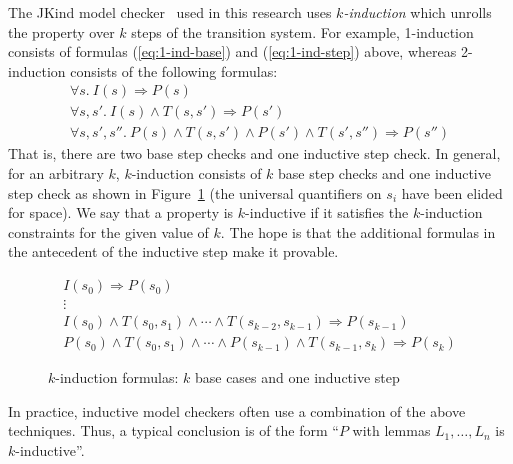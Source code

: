 The JKind model checker~\cite{2017arXiv171201222G} used in this research uses {\em
  $k$-induction} which unrolls the property over $k$ steps of the
transition system. For example, 1-induction consists of formulas
(\ref{eq:1-ind-base}) and (\ref{eq:1-ind-step}) above, whereas
2-induction consists of the following formulas:
\begin{gather*}
\forall s.~ I(s) \Rightarrow P(s) \\
\forall s, s'.~ I(s) \land T(s, s') \Rightarrow P(s') \\
\forall s, s', s''.~ P(s) \land T(s, s') \land P(s') \land T(s',
  s'') \Rightarrow P(s'')
\end{gather*}
That is, there are two base step checks and one inductive step check.
In general, for an arbitrary $k$, $k$-induction consists of $k$
base step checks and one inductive step check as shown in
Figure~\ref{fig:k-induction} (the universal quantifiers on $s_i$ have
been elided for space). We say that a property is $k$-inductive if it
satisfies the $k$-induction constraints for the given value of $k$.
The hope is that the additional formulas in the antecedent of the
inductive step make it provable.

\begin{figure}
\begin{gather*}
I(s_0) \Rightarrow P(s_0) \\[-2pt]
%
\vdots \\[2pt]
%
I(s_0) \land T(s_0, s_1) \land \cdots \land T(s_{k-2}, s_{k-1})
\Rightarrow P(s_{k-1}) \\[2pt]
%
P(s_0) \land T(s_0, s_1) \land \cdots \land P(s_{k-1}) \land
T(s_{k-1}, s_k) \Rightarrow P(s_k)
\end{gather*}
\caption{$k$-induction formulas: $k$ base cases and one inductive
  step}
\label{fig:k-induction}
\end{figure}

In practice, inductive model checkers often use a combination of the
above techniques. Thus, a typical conclusion is of the form ``$P$ with
lemmas $L_1, \ldots, L_n$ is $k$-inductive''.



